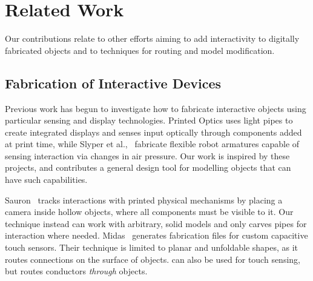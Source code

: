\section{Related Work}
Our contributions relate to other efforts aiming to add interactivity to digitally fabricated objects and to techniques for routing and model modification.  

\subsection{Fabrication of Interactive Devices}

Previous work has begun to investigate how to fabricate interactive objects using particular sensing and display technologies. Printed Optics \cite{Willis-printedoptics} uses light pipes to create integrated displays and senses input optically through components added at print time, while Slyper et al.,~\cite{Slyper-pressure} fabricate flexible robot armatures capable of sensing interaction via changes in air pressure. Our work is inspired by these projects, and contributes a general design tool for modelling objects that can have such capabilities.  

Sauron~\cite{Savage-sauron} tracks interactions with printed physical mechanisms by placing a camera inside hollow objects, where all components must be visible to it.  Our technique instead can work with arbitrary, solid models and only carves pipes for interaction where needed. Midas~\cite{Savage-midas} generates fabrication files for custom capacitive touch sensors.  Their technique is limited to planar and unfoldable shapes, as it routes connections on the surface of objects. \systemname can also be used for touch sensing, but routes conductors \emph{through} objects.



